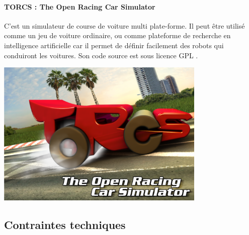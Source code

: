 \documentclass[a4paper,12pt]{article}
\begin{document}
    \paragraph{TORCS : The Open Racing Car Simulator} C'est un simulateur de course de voiture multi plate-forme.
    Il peut être utilisé comme un jeu de voiture ordinaire, ou comme plateforme de recherche en intelligence artificielle 
    car il permet de définir facilement des robots qui conduiront les voitures. 
    Son code source est sous licence GPL
    \cite{TORCS}.
    
      \begin{center}
    \includegraphics[height=70mm]{../images/torcs.png} 
  \end{center}
  

  \subsection{Contraintes techniques}
  
\end{document}
